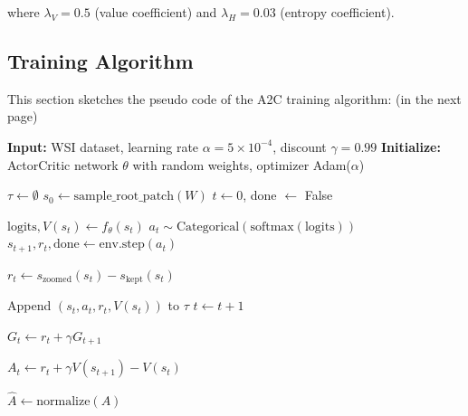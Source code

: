 \documentclass[11pt]{article}
\begin{document}
where $\lambda_V = 0.5$ (value coefficient) and $\lambda_H = 0.03$ (entropy coefficient).

\subsection{Training Algorithm}
This section sketches the pseudo code of the A2C training algorithm: (in the next page)

\begin{algorithm}
\caption{A2C Training for Hierarchical Patch Zooming}
\begin{algorithmic}[1]
\State \textbf{Input:} WSI dataset, learning rate $\alpha = 5 \times 10^{-4}$, discount $\gamma = 0.99$
\State \textbf{Initialize:} ActorCritic network $\theta$ with random weights, optimizer Adam($\alpha$)

            
            \State $\tau \gets \emptyset$ 
            \State $s_0 \gets \text{sample\_root\_patch}(W)$ 
            \State $t \gets 0$, done $\gets$ False
            
                \State $\text{logits}, V(s_t) \gets f_\theta(s_t)$
                \State $a_t \sim \text{Categorical}(\text{softmax}(\text{logits}))$ 
                \State $s_{t+1}, r_t, \text{done} \gets \text{env.step}(a_t)$ 
                
                    \State $r_t \gets s_{\text{zoomed}}(s_t) - s_{\text{kept}}(s_t)$ 
                \EndIf
                
                \State Append $(s_t, a_t, r_t, V(s_t))$ to $\tau$
                \State $t \gets t + 1$
            \EndWhile
            
            \State {}
                \State $G_t \gets r_t + \gamma G_{t+1}$ 
            \EndFor
            
                \State $A_t \gets r_t + \gamma V(s_{t+1}) - V(s_t)$ 
            \EndFor
            
            \State $\hat{A} \gets \text{normalize}(A)$ 
            

\end{algorithmic}
\end{algorithm}
\end{document}
